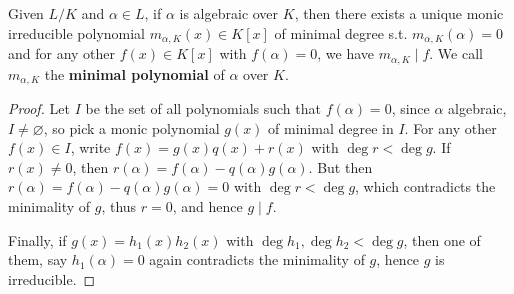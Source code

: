 \begin{prop}
  Given $L/K$ and $\alpha \in L$, if $\alpha$ is algebraic over $K$, then
  there exists a unique monic irreducible polynomial $m_{\alpha, K}(x) \in K[x]$
  of minimal degree s.t. $m_{\alpha, K}(\alpha) = 0$ and for any other
  $f(x) \in K[x]$ with $f(\alpha) = 0$, we have $m_{\alpha, K} \mid f$.
  We call $m_{\alpha, K}$ the {\bf minimal polynomial} of $\alpha$ over $K$.

  \begin{proof}

    Let $I$ be the set of all polynomials such that $f(\alpha) = 0$, since $\alpha$ algebraic,
    $I \neq \varnothing$, so pick a monic polynomial $g(x)$ of minimal degree in $I$.
    For any other $f(x) \in I$, write $f(x) = g(x) q(x) + r(x)$ with $\deg r < \deg g$.
    If $r(x) \neq 0$, then $r(\alpha) = f(\alpha) - q(\alpha) g(\alpha)$.
    But then $r(\alpha) = f(\alpha) - q(\alpha) g(\alpha) = 0$ with $\deg r < \deg g$,
    which contradicts the minimality of $g$, thus $r = 0$, and hence $g \mid f$.

    Finally, if $g(x) = h_1(x) h_2(x)$ with $\deg h_1, \deg h_2 < \deg g$,
    then one of them, say $h_1(\alpha) = 0$ again contradicts the minimality of $g$,
    hence $g$ is irreducible.
  \end{proof}
\end{prop}

